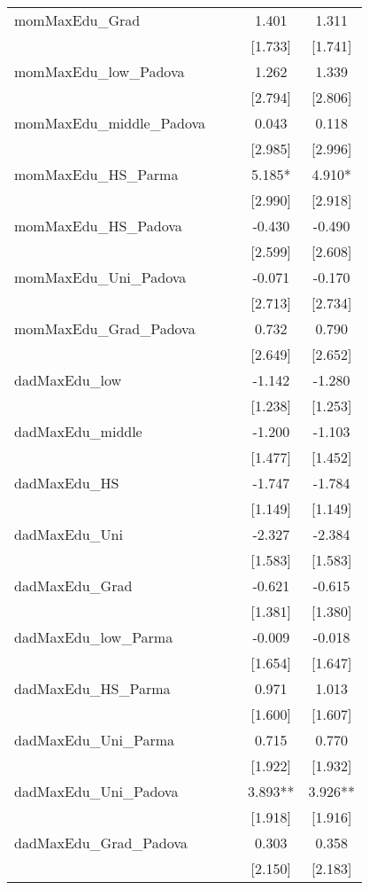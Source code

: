 \documentclass[]{article}
\begin{document}
\begin{tabular}{lcccc}
momMaxEdu\_Grad &  &  & 1.401 & 1.311 \\
 &  &  & [1.733] & [1.741] \\
momMaxEdu\_low\_Padova &  &  & 1.262 & 1.339 \\
 &  &  & [2.794] & [2.806] \\
momMaxEdu\_middle\_Padova &  &  & 0.043 & 0.118 \\
 &  &  & [2.985] & [2.996] \\
momMaxEdu\_HS\_Parma &  &  & 5.185* & 4.910* \\
 &  &  & [2.990] & [2.918] \\
momMaxEdu\_HS\_Padova &  &  & -0.430 & -0.490 \\
 &  &  & [2.599] & [2.608] \\
momMaxEdu\_Uni\_Padova &  &  & -0.071 & -0.170 \\
 &  &  & [2.713] & [2.734] \\
momMaxEdu\_Grad\_Padova &  &  & 0.732 & 0.790 \\
 &  &  & [2.649] & [2.652] \\
dadMaxEdu\_low &  &  & -1.142 & -1.280 \\
 &  &  & [1.238] & [1.253] \\
dadMaxEdu\_middle &  &  & -1.200 & -1.103 \\
 &  &  & [1.477] & [1.452] \\
dadMaxEdu\_HS &  &  & -1.747 & -1.784 \\
 &  &  & [1.149] & [1.149] \\
dadMaxEdu\_Uni &  &  & -2.327 & -2.384 \\
 &  &  & [1.583] & [1.583] \\
dadMaxEdu\_Grad &  &  & -0.621 & -0.615 \\
 &  &  & [1.381] & [1.380] \\
dadMaxEdu\_low\_Parma &  &  & -0.009 & -0.018 \\
 &  &  & [1.654] & [1.647] \\
dadMaxEdu\_HS\_Parma &  &  & 0.971 & 1.013 \\
 &  &  & [1.600] & [1.607] \\
dadMaxEdu\_Uni\_Parma &  &  & 0.715 & 0.770 \\
 &  &  & [1.922] & [1.932] \\
dadMaxEdu\_Uni\_Padova &  &  & 3.893** & 3.926** \\
 &  &  & [1.918] & [1.916] \\
dadMaxEdu\_Grad\_Padova &  &  & 0.303 & 0.358 \\
 &  &  & [2.150] & [2.183] \\

\end{tabular}
\end{document}
